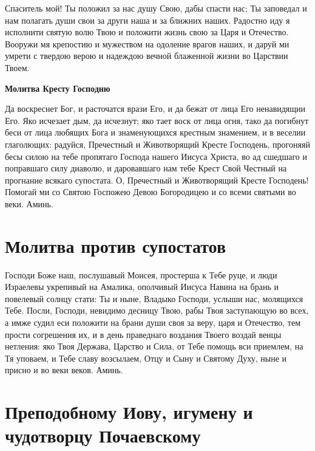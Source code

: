 
Спаситель мой! Ты положил за нас душу Свою, дабы спасти нас; Ты заповедал и нам полагать души свои за други наша и за ближних наших. Радостно иду я исполнити святую волю Твою и положити жизнь свою за Царя и Отечество. Вооружи мя крепостию и мужеством на одоление врагов наших, и даруй ми умрети с твердою верою и надеждою вечной блаженной жизни во Царствии Твоем.


\medskip


\bfseries Молитва Кресту Господню\normalfont{}


Да воскреснет Бог, и расточатся врази Его, и да бежат от лица Его ненавидящии Его. Яко исчезает дым, да исчезнут; яко тает воск от лица огня, тако да погибнут беси от лица любящих Бога и знаменующихся крестным знамением, и в веселии глаголющих: радуйся, Пречестный и Животворящий Кресте Господень, прогоняяй бесы силою на тебе пропятаго Господа нашего Иисуса Христа, во ад сшедшаго и поправшаго силу диаволю, и даровавшаго нам тебе Крест Свой Честный на прогнание всякаго супостата. О, Пречестный и Животворящий Кресте Господень! Помогай ми со Святою Госпожею Девою Богородицею и со всеми святыми во веки. Аминь.


\section{Молитва против супостатов}
 


Господи Боже наш, послушавый Моисея, простерша к Тебе руце, и люди Израелевы укрепивый на Амалика, ополчивый Иисуса Навина на брань и повелевый солнцу стати: Ты и ныне, Владыко Господи, услыши нас, молящихся Тебе. Посли, Господи, невидимо десницу Твою, рабы Твоя заступающую во всех, а имже судил еси положити на брани души своя за веру,  царя и Отечество, тем прости согрешения их, и в день праведнаго воздания Твоего воздай венцы нетления: яко Твоя Держава, Царство и Сила, от Тебе помощь вси приемлем, на Тя уповаем, и Тебе славу возсылаем, Отцу и Сыну и Святому Духу, ныне и присно и во веки веков. Аминь.





\section{Преподобному Иову, игумену и чудотворцу Почаевскому}
 
